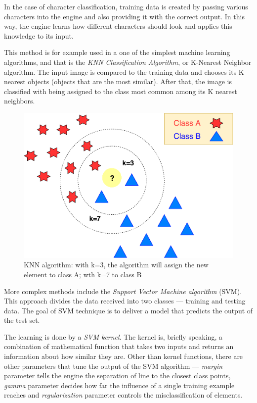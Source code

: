In the case of character classification, training data is created by passing various characters into the engine and also providing it with the correct output. In this way, the engine learns how different characters should look and applies this knowledge to its input.

This method is for example used in a one of the simplest machine learning algorithms, and that is the \emph{KNN Classification Algorithm}, or K-Nearest Neighbor algorithm. The input image is compared to the training data and chooses its K nearest objects (objects that are the most similar). After that, the image is classified with being assigned to the class most common among its K nearest neighbors.

\begin{figure}[H]
\centering
\includegraphics[width=0.7\linewidth]{img/characterClassification/knn.pdf}
\caption{KNN algorithm: with k=3, the algorithm will assign the new element to class A; wth k=7 to class B } \label{fig:1a}
\end{figure}

More complex methods include the \emph{Support Vector Machine algorithm} (SVM). This approach divides the data received into two classes --- training and testing data. The goal of SVM technique is to deliver a model that predicts the output of the test set.

The learning is done by a \emph{SVM kernel}. The kernel is, briefly speaking, a combination of mathematical function that takes two inputs and returns an information about how similar they are. Other than kernel functions, there are other parameters that tune the output of the SVM algorithm --- \emph{margin} parameter tells the engine the separation of line to the closest class points, \emph{gamma} parameter decides how far the influence of a single training example reaches and \emph{regularization} parameter controls the misclassification of elements.

